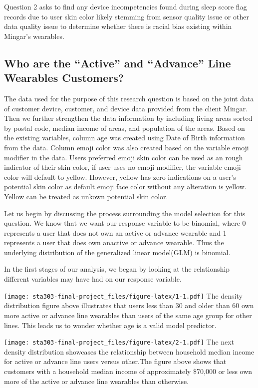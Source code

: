 \documentclass[
          english,
          paper=a4,
              ,captions=tableheading
  ]{scrartcl}
\begin{document}
Question 2 asks to find any device incompetencies found during sleep
score flag records due to user skin color likely stemming from sensor
quality issue or other data quality issue to determine whether there is
racial bias existing within Mingar's wearables.

\hypertarget{who-are-the-active-and-advance-line-wearables-customers}{%
\subsection{Who are the ``Active'' and ``Advance'' Line Wearables
Customers?}\label{who-are-the-active-and-advance-line-wearables-customers}}

The data used for the purpose of this research question is based on the
joint data of customer device, customer, and device data provided from
the client Mingar. Then we further strengthen the data information by
including living areas sorted by postal code, median income of areas,
and population of the areas. Based on the existing variables, column age
was created using Date of Birth information from the data. Column emoji
color was also created based on the variable emoji modifier in the data.
Users preferred emoji skin color can be used as an rough indicator of
their skin color, if user uses no emoji modifier, the variable emoji
color will default to yellow. However, yellow has zero indications on a
user's potential skin color as default emoji face color without any
alteration is yellow. Yellow can be treated as unkown potential skin
color.

Let us begin by discussing the process surrounding the model selection
for this question. We know that we want our response variable to be
binomial, where 0 represents a user that does not own an active or
advance wearable and 1 represents a user that does own anactive or
advance wearable. Thus the underlying distribution of the generalized
linear model(GLM) is binomial.

In the first stages of our analysis, we began by looking at the
relationship different variables may have had on our response variable.

\texttt{[image: sta303-final-project\_files/figure-latex/1-1.pdf]} The
density distribution figure above illustrates that users less than 30
and older than 60 own more active or advance line wearables than users
of the same age group for other lines. This leads us to wonder whether
age is a valid model predictor.

\texttt{[image: sta303-final-project\_files/figure-latex/2-1.pdf]} The
next density distribution showcases the relationship between household
median income for active or advance line users versus other.The figure
above shows that customers with a household median income of
approximately \$70,000 or less own more of the active or advance line
wearables than otherwise.
\end{document}
